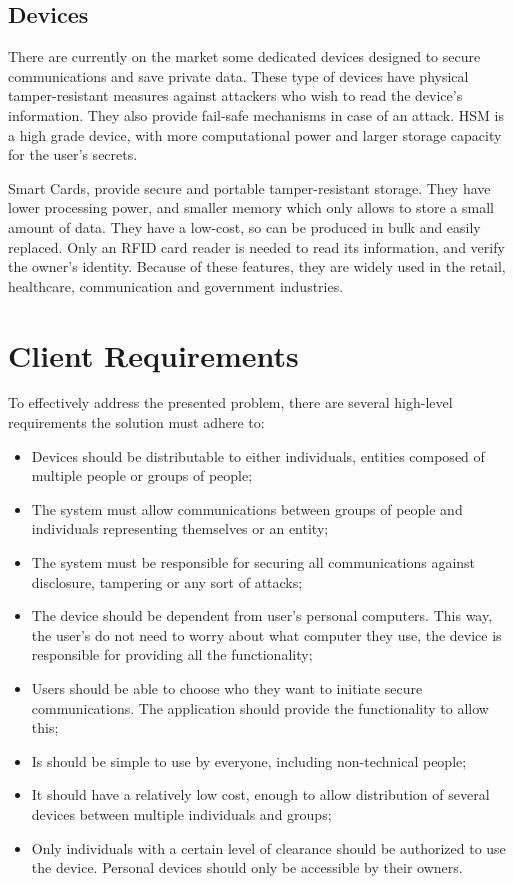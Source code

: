\subsection{Devices}\label{chap:problem:devices}
There are currently on the market some dedicated devices designed to secure communications and save private data.
These type of devices have physical tamper-resistant measures against attackers who wish to read the device's information. They also provide fail-safe mechanisms in case of an attack.
\ac{HSM} is a high grade device, with more computational power and larger storage capacity for the user's secrets.

Smart Cards, provide secure and portable tamper-resistant storage.
They have lower processing power, and smaller memory which only allows to store a small amount of data.
They have a low-cost, so can be produced in bulk and easily replaced. Only an RFID card reader is needed to read its information, and verify the owner's identity.
Because of these features, they are widely used in the retail, healthcare, communication and government industries.


\section{Client Requirements}\label{chap:problem:requirements}

To effectively address the presented problem, there are several high-level requirements the solution must adhere to:
\begin{itemize}
	\item Devices should be distributable to either individuals, entities composed of multiple people or groups of people;
	\item The system must allow communications between groups of people and individuals representing themselves or an entity;
	\item The system must be responsible for securing all communications against disclosure, tampering or any sort of attacks;
	\item The device should be dependent from user's personal computers. This way, the user's do not need to worry about what computer they use, the device is responsible for providing all the functionality;
	\item Users should be able to choose who they want to initiate secure communications. The application should provide the functionality to allow this;
	\item Is should be simple to use by everyone, including non-technical people;
	\item It should have a relatively low cost, enough to allow distribution of several devices between multiple individuals and groups;
	\item Only individuals with a certain level of clearance should be authorized to use the device. Personal devices should only be accessible by their owners.
\end{itemize}

